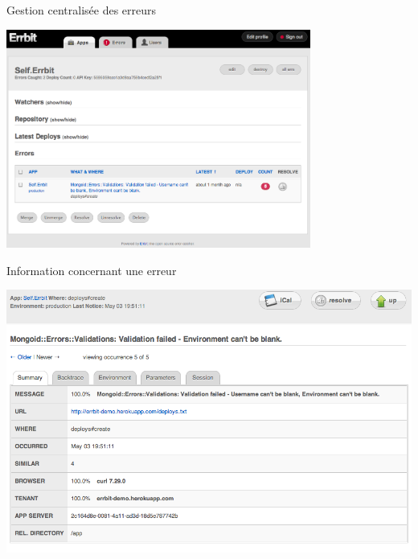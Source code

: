 \documentclass{beamer}
\begin{document}
\begin{frame}
  \begin{overlayarea}{10cm}{0.5cm}
    \centering
    \huge
    Gestion centralisée des erreurs
    \par
  \end{overlayarea}
  \begin{overlayarea}{10cm}{7cm}
    \centering
    \vfill
    \includegraphics[width=10cm]{visualisation_des_erreurs.png}
  \end{overlayarea}
\end{frame}

\begin{frame}
  \begin{overlayarea}{10cm}{0.5cm}
    \centering
    \huge
    Information concernant une erreur
    \par
  \end{overlayarea}
  \begin{overlayarea}{10cm}{6cm}
    \centering
    \vfill
    \includegraphics[width=\linewidth]{visualisation_d_une_erreur.png}
  \end{overlayarea}
\end{frame}
\end{document}
